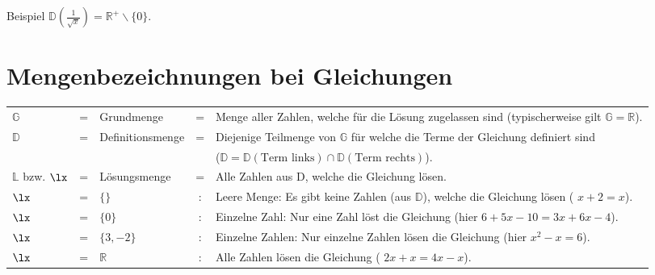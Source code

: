 Beispiel $\mathbb{D}(\frac{1}{\sqrt{x}}) = \mathbb{R}^{+}\backslash \{0\}$.

\section{Mengenbezeichnungen bei Gleichungen}
\begin{tabular}{lclcp{10cm}}
  $\mathbb{G}$ &=& Grundmenge &=& Menge aller Zahlen, welche für die Lösung zugelassen sind (typischerweise gilt $\mathbb{G}=\mathbb{R}$). \\
  $\mathbb{D}$ &=& Definitionsmenge &=& Diejenige Teilmenge von
                                        $\mathbb{G}$ für welche die Terme der Gleichung definiert sind\\
   & & & &  ($\mathbb{D}=\mathbb{D}(\textrm{Term links})\cap\mathbb{D}(\textrm{Term rechts})$).\\

   $\mathbb{L}$ bzw. $\lx$ &=& Lösungsmenge &=& Alle Zahlen
  aus D, welche die Gleichung lösen.\\

  $\lx$ &=&$\{\}$ &:& Leere Menge: Es gibt keine Zahlen
  (aus $\mathbb{D}$), welche die Gleichung lösen (\zB{} $x+2=x$).\\

  $\lx$ &=&$\{0\}$ &:& Einzelne Zahl: Nur eine Zahl löst die
  Gleichung (hier \zB{} $6+5x-10=3x+6x-4$).\\

 $\lx$ &=&$\{3, -2\}$ &:& Einzelne Zahlen: Nur einzelne
  Zahlen lösen die Gleichung (hier \zB{} $x^2-x=6$).\\

  $\lx$ &=& $\mathbb{R}$ &:& Alle Zahlen lösen die Gleichung
  (\zB{} $2x+x=4x-x$).\\

\end{tabular}




